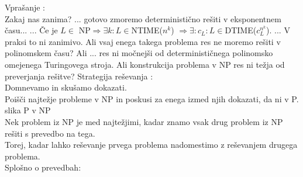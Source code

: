 \documentclass[10pt,a4paper,oneside]{book}
\begin{document}
\begin{neurejeno}
%
Vprašanje \PNP:\fixme\\
Zakaj nas zanima?
...
gotovo zmoremo deterministično rešiti v eksponentnem času...
...
Če je $L \in$ NP$\Rightarrow \exists k: L \in $NTIME($n^k$) $\Rightarrow \exists : c_L : L \in $DTIME($c_L^{n^k}$). ... V praksi to ni zanimivo.
Ali vsaj enega takega problema res ne moremo rešiti v polinomskem času?
Ali ... res ni močnejši od determinističnega polinomsko omejenega Turingovega stroja.
\br
Ali konstrukcija problema v NP res ni težja od preverjanja rešitve?
\br
Strategija reševanja \PNP:\\
Domnevamo \PniNP in skušamo dokazati.\\
Poišči najtežje probleme v NP in poskusi za enega izmed njih dokazati, da ni v P.\\
\fixme slika P v NP \\
Nek problem iz NP je med najtežjimi, kadar znamo vsak drug problem iz NP rešiti s prevedbo na tega.\\
Torej, kadar lahko reševanje prvega problema nadomestimo z reševanjem drugega problema.\\
Splošno o prevedbah:\\
\end{neurejeno}
\end{document}
